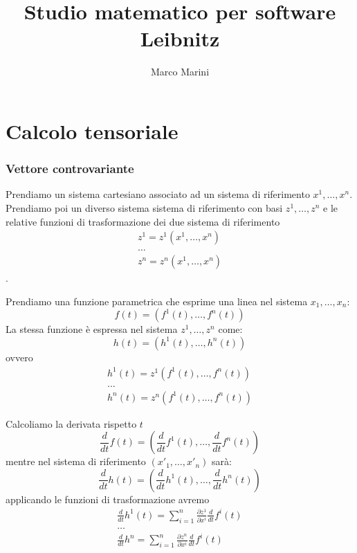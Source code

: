 \documentclass[a4paper,11pt]{article}
\title{Studio matematico per software Leibnitz}
\author{Marco Marini}
\begin{document}
\maketitle
\tableofcontents

\begin{abstract}
\end{abstract}

\part{Calcolo tensoriale}

\section{Vettore controvariante}

Prendiamo un sistema cartesiano associato ad un sistema di riferimento $ x^1, \dots, x^n $.
Prendiamo poi un diverso sistema sistema di riferimento con basi $ z^1, \dots, z^n $ e le relative funzioni
di trasformazione dei due sistema di riferimento
\begin{eqnarray*}
  z^1=z^1(x^1, \dots, x^n)
  \\
  \dots
  \\
  z^n=z^n(x^1, \dots, x^n)
\end{eqnarray*}
.
 
Prendiamo una funzione parametrica che esprime una linea nel sistema $ x_1, \dots, x_n $:
\[ f(t) = ( f^1(t), \dots,  f^n(t) ) \] 
La stessa funzione è espressa nel sistema $ z^1, \dots, z^n $ come:
\[ h(t) = ( h^1(t), \dots,  h^n(t) ) \]
ovvero
\begin{eqnarray*}
  h^1(t) = z^1 \left( f^1(t), \dots, f^n(t) \right)
  \\
  \dots
  \\
  h^n(t) = z^n \left( f^1(t), \dots, f^n(t) \right)
\end{eqnarray*}

Calcoliamo la derivata rispetto $ t $
\begin{equation}\label{eq:vettore1}
  \frac{d}{dt} f(t) = \left( \frac{d}{dt} f^1(t), \dots, \frac{d}{dt} f^n(t) \right)
\end{equation}
mentre nel sistema di riferimento $ (x'_1, \dots, x'_n) $ sarà:
\begin{equation}\label{eq:vettore2}
  \frac{d}{dt} h(t)= \left( \frac{d}{dt} h^1(t), \dots, \frac{d}{dt} h^n(t) \right)
\end{equation}
applicando le funzioni di trasformazione avremo
\begin{equation}\label{eq:vettore3}
\begin{array}{r}
  \frac{d}{dt} h^1(t) = \sum_{i=1}^n \frac{\partial z^1}{\partial x^i} \frac{d}{dt} f^i(t)
  \\
  \dots
  \\
  \frac{d}{dt} h^n= \sum_{i=1}^n \frac{\partial z^n}{\partial x^i} \frac{d}{dt} f^i(t)
\end{array}
\end{equation}
\end{document}
